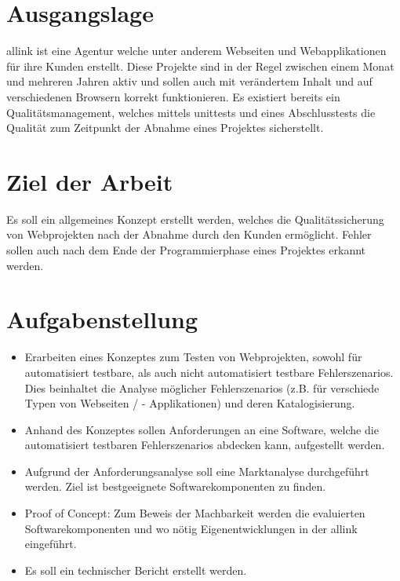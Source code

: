 \section{Ausgangslage}
\label{sec:anhang_ausgangslage}
allink ist eine Agentur welche unter anderem Webseiten und Webapplikationen für ihre Kunden erstellt. Diese Projekte sind in der Regel zwischen einem Monat und mehreren Jahren aktiv und sollen auch mit verändertem Inhalt und auf verschiedenen Browsern korrekt funktionieren. Es existiert bereits ein Qualitätsmanagement, welches mittels \glspl{unittest} und eines Abschlusstests die Qualität zum Zeitpunkt der Abnahme eines Projektes sicherstellt.

\section{Ziel der Arbeit}
\label{sec:anhang_ziel_der_arbeit}
Es soll ein allgemeines Konzept erstellt werden, welches die Qualitätssicherung von Webprojekten nach der Abnahme durch den Kunden ermöglicht. Fehler sollen auch nach dem Ende der Programmierphase eines Projektes erkannt werden.

\section{Aufgabenstellung}
\label{sec:anhang_aufgabenstellung}
\begin{itemize}
  \item Erarbeiten eines Konzeptes zum Testen von Webprojekten, sowohl für automatisiert testbare, als auch nicht automatisiert testbare Fehlerszenarios. Dies beinhaltet die Analyse möglicher Fehlerszenarios (z.B. für verschiede Typen von Webseiten / - Applikationen) und deren Katalogisierung.
  \item Anhand des Konzeptes sollen Anforderungen an eine Software, welche die automatisiert testbaren Fehlerszenarios abdecken kann, aufgestellt werden.
  \item Aufgrund der Anforderungsanalyse soll eine Marktanalyse durchgeführt werden. Ziel ist bestgeeignete Softwarekomponenten zu finden.
  \item Proof of Concept: Zum Beweis der Machbarkeit werden die evaluierten Softwarekomponenten und wo nötig Eigenentwicklungen in der allink eingeführt.
  \item Es soll ein technischer Bericht erstellt werden.
\end{itemize}

